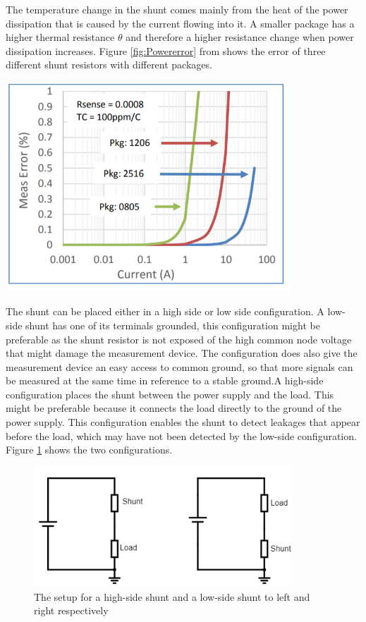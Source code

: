 The temperature change in the shunt comes mainly from the heat of the power dissipation that is caused by the current flowing into it. A smaller package has a higher thermal resistance $\theta$ and therefore a higher resistance change when power dissipation increases. Figure \ref{fig:Powererror} from \cite{Intersil} shows the error of three different shunt resistors with different packages. 

\begin{minipage}[t]{0.8\textwidth}
\centering
    \includegraphics[width=0.8\textwidth]{Images/Powererror.PNG}\\
    \captionsetup{justification=centering}
    \label{fig:Powererror}
\end{minipage}


The shunt can be placed either in a high side or low side configuration. A low-side shunt has one of its terminals grounded, this configuration might be preferable as the shunt resistor is not exposed of the high common node voltage that might damage the measurement device. The configuration does also give the measurement device an easy access to common ground, so that more signals can be measured at the same time in reference to a stable ground.A high-side configuration places the shunt between the power supply and the load. This might be preferable because it connects the load directly to the ground of the power supply. This configuration enables the shunt to detect leakages that appear before the load, which may have not been detected by the low-side configuration. Figure \ref{fig:shunt} shows the two configurations. \hfill \break


\begin{figure}[h]
\centering
\includegraphics[height=4.5cm]{Project_Report/Images/shunt.PNG}
\caption{The setup for a high-side shunt and a low-side shunt to left and right respectively}
\label{fig:shunt}
\end{figure}





